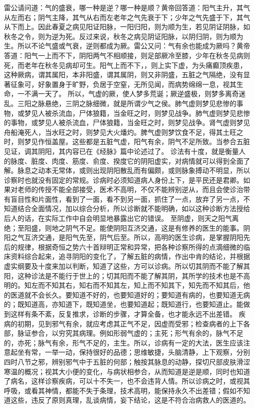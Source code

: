 \documentclass[a4paper,12pt,UTF8,twoside]{ctexbook}
\begin{document}
雷公请问道：气的盛衰，哪一种是逆？哪一种是顺？黄帝回答道：阳气主升，其气从左而右；阴气主降，其气从右而左老年之气先衰于下；少年之气先盛于下，其气从下而上。因此春夏之病见阳证阳脉，一阳归阳，则为顺为生，若见阴证阴脉，如秋冬之令，则为逆为死。反过来说，秋冬之病见阴证阳脉，以阴归阴，则为顺为生。所以不论气盛或气衰，逆则都成为厥。雷公又问：气有余也能成为厥吗？黄帝答道：阳气一上而不下，阴阳两气不相顺接，则足部厥冷至膝，少年在秋冬见病则死，而老年在秋冬见病却可生。阳气上而不下，，则上实下虚，为头痛癫顶疾患，这种厥病，谓其属阳，本非阳盛，谓其属阴，则又非阴盛，五脏之气隔绝，没有显著征象可，好象置身于旷野，负居于空窒，无所见闻，而病势绵绵一息，视其生命，一不满一天了。
所以，气虚的厥，使人梦多荒诞；厥逆盛极，则梦多离奇迷乱。三阳之脉悬绝，三阴之脉细微，就是所谓少气之侯。肺气虚则梦见悲惨的事物，或梦见人被杀流血，尸体狼籍，当金旺之时，则梦见战争。肺气虚则梦见悲惨的事物，或梦见人被杀流血，尸体狼籍，当金旺之时，则梦见战争。肾气虚则梦见舟船淹死人，当水旺之时，则梦见大火燔灼。脾气虚则梦饮食不足，得其土旺之时，则梦见作恒盖屋。这些都是五脏气虚，阳气有余，阴气不足所致。当参合五脏见证，调其阴阳，其内容已在《经脉》篇中论述过了。
诊法有十度，就是衡量人的脉度、脏度、肉度、筋度、俞度、揆度它的阴阳虚实，对病情就可以得到全面了解。脉息之动本无常体，或则出现阴阳散乱而有偏颇，或则脉象搏动不明显，所以诊察时也就没有固定的常规。诊病时必须知道病人身份上下，是平民还是君卿。如果对老师的传授不能全部接受，医术不高明，不仅不能辨别逆从，而且会使诊治带有盲目性和片面性，看到了一面，看不到另一面，抓住了一点，放弃了另一点，不知道结合全面情况，加以综合分析，所以诊断就不能明确，如以这种诊断方法授给后人的话，在实际工作中自会明显地暴露出它的错误。
至阴虚，则天之阳气离绝；至阳盛，则地之阴气不足。能使阴阳互济交通，这是有修养的医生的能事。阴阳之气互济交通，是阳气先至，阴气后至。所以，高明的医生诊病，是掌握阴阳先后的规律，根据奇恒之势六十首辩明正常和异常，把各种诊察所得的点滴细微的临床资料综合起来，追寻阴阳的变化了，了解五脏的病情，作出中肯的结论，并根据虚实纲要及十度来加以判断，知道了这些，方可以诊病。所以切其阴而不能了解其阳，这种诊法是不能行于世上的；切其阳而不能了解其阴，其所学的技术也是不高明的。知左而不知其右，知右而不知其左，知上而不知其下，知先而不知其后，他的医道就不会长久。要知道不好的，也要知道好的；要知道有病的，也要知道无病的；既知道高，亦知道下，既知道坐，也要知道起；既知道行，也要知道止。能做到这样有条不紊，反复推求，诊断的步骤，才算全备，也才能永远不出差错。
疾病的初期，见到邪气有余，就应考虑其正气不足，因虚而受邪；检查病者的上下各部，脉证参合，以穷究其病理。例如形弱气虚的；主死；形气有余的，脉气不足的，亦死；脉气有余，形气不足的，主生。所以，诊病有一定的大法，医生应该注意起坐有常，一举一动，保持很好的品德；思维敏捷，头脑清静，上下观察，分别四时八节之邪，辨别邪气中于五脏的何部；触按其脉息的动静，探切尺部皮肤滑涩寒温的概况；视其大小便的变化，与病状相参合，从而知道是逆是顺，同时也知道了病名，这样诊察疾病，可以十不失一，也不会违背人情。所以诊病之时，或视其呼吸，或看其神情，都能不失于条理，技术高明，能保持永久不出差错；假如不知道这些，违反了原则真理，乱谈病情，妄下结论，这是不符合治病救人的医道的。
\end{document}
